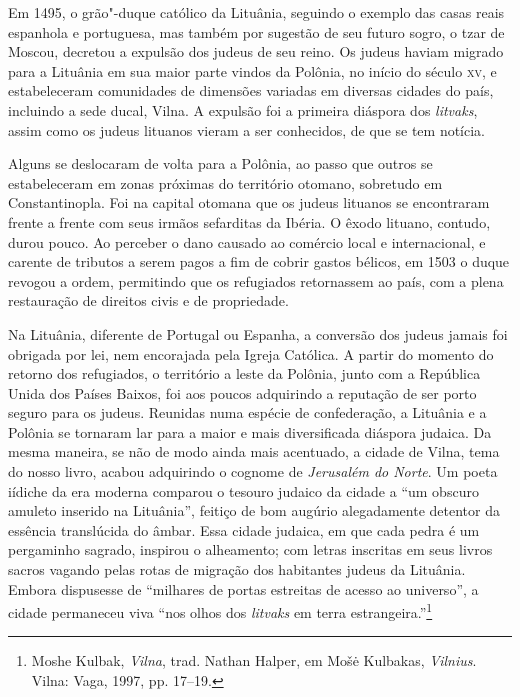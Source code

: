 Em 1495, o grão"-duque católico da Lituânia, seguindo o exemplo das casas
reais espanhola e portuguesa, mas também por sugestão de seu futuro
sogro, o tzar de Moscou, decretou a expulsão dos judeus de seu reino. Os
judeus haviam migrado para a Lituânia em sua maior parte vindos da
Polônia, no início do século \textsc{xv}, e estabeleceram comunidades de
dimensões variadas em diversas cidades do país, incluindo a sede ducal,
Vilna. A expulsão foi a primeira diáspora dos \textit{litvaks}, assim como os
judeus lituanos vieram a ser conhecidos, de que se tem notícia. 

Alguns
se deslocaram de volta para a Polônia, ao passo que outros se
estabeleceram em zonas próximas do território otomano, sobretudo em
Constantinopla. Foi na capital otomana que os judeus lituanos se
encontraram frente a frente com seus irmãos sefarditas da Ibéria. O
êxodo lituano, contudo, durou pouco. Ao perceber o dano causado ao
comércio local e internacional, e carente de tributos a serem pagos a
fim de cobrir gastos bélicos, em 1503 o duque revogou a ordem,
permitindo que os refugiados retornassem ao país, com a plena
restauração de direitos civis e de propriedade. 

Na Lituânia, diferente
de Portugal ou Espanha, a conversão dos judeus jamais foi obrigada por
lei, nem encorajada pela Igreja Católica. A partir do momento do retorno
dos refugiados, o território a leste da Polônia, junto com a República
Unida dos Países Baixos, foi aos poucos adquirindo a reputação de ser
porto seguro para os judeus. Reunidas numa espécie de confederação, a
Lituânia e a Polônia se tornaram lar para a maior e mais diversificada
diáspora judaica. Da mesma maneira, se não de modo ainda mais acentuado,
a cidade de Vilna, tema do nosso livro, acabou adquirindo o cognome de
\textit{Jerusalém do Norte}. Um poeta iídiche da era moderna comparou o tesouro
judaico da cidade a ``um obscuro amuleto inserido na Lituânia'', feitiço
de bom augúrio alegadamente detentor da essência translúcida do âmbar.
Essa cidade judaica, em que cada pedra é um pergaminho sagrado, inspirou
o alheamento; com letras inscritas em seus livros sacros vagando pelas
rotas de migração dos habitantes judeus da Lituânia. Embora dispusesse
de ``milhares de portas estreitas de acesso ao universo'', a cidade
permaneceu viva ``nos olhos dos \textit{litvaks} em terra
estrangeira.''\footnote{Moshe Kulbak, \textit{Vilna}, trad. Nathan
  Halper, em Mošė Kulbakas, \textit{Vilnius}. Vilna: Vaga, 1997, pp.
  17--19.}

